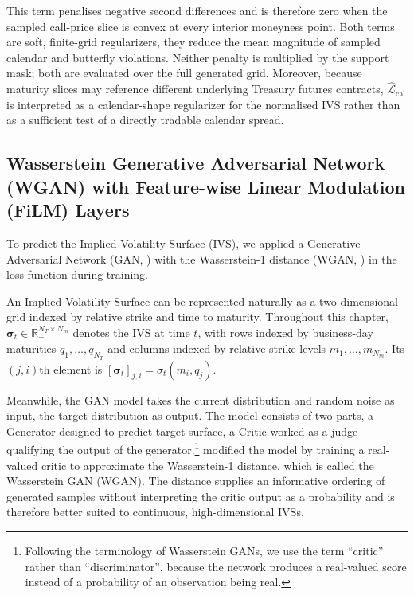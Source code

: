 This term penalises negative second differences and is therefore zero when the sampled call-price slice is convex at every interior moneyness point. Both terms are soft, finite-grid regularizers, they reduce the mean magnitude of sampled calendar and butterfly violations. Neither penalty is multiplied by the support mask; both are evaluated over the full generated grid. Moreover, because maturity slices may reference different underlying Treasury futures contracts, \(\widehat{\mathcal{L}}_{\mathrm{cal}}\) is interpreted as a calendar-shape regularizer for the normalised IVS rather than as a sufficient test of a directly tradable calendar spread. 







\subsection*{Wasserstein Generative Adversarial Network (WGAN) with Feature-wise Linear Modulation (FiLM) Layers}

To predict the Implied Volatility Surface (IVS), we applied a Generative Adversarial Network (GAN, \citealp{goodfellow2020generative}) with the Wasserstein-1 distance (WGAN, \citealp{arjovsky2017wasserstein}) in the loss function during training.

An Implied Volatility Surface can be represented naturally as a two-dimensional
grid indexed by relative strike and time to maturity. Throughout this chapter,
\(\boldsymbol{\sigma}_t\in\mathbb{R}_{+}^{N_T\times N_m}\) denotes the IVS at
time \(t\), with rows indexed by business-day maturities
\(q_1,\ldots,q_{N_T}\) and columns indexed by relative-strike levels
\(m_1,\ldots,m_{N_m}\). Its \((j,i)\)th element is
\([\boldsymbol{\sigma}_t]_{j,i}=\sigma_t(m_i,q_j)\).


Meanwhile, the GAN model takes the current distribution and random noise as input, the target distribution as output. The model consists of two parts, a Generator designed to predict target surface, a Critic worked as a judge qualifying the output of the generator.\footnote{Following the terminology of Wasserstein GANs, we use the term ``critic'' rather than ``discriminator'', because the network produces a real-valued score instead of a probability of an observation being real.} \cite{arjovsky2017wasserstein} modified the model by training a real-valued critic to approximate the Wasserstein-1 distance, which is called the Wasserstein GAN (WGAN). The distance supplies an informative ordering of generated samples without interpreting the critic output as a probability and is therefore better suited to continuous, high-dimensional IVSs.

